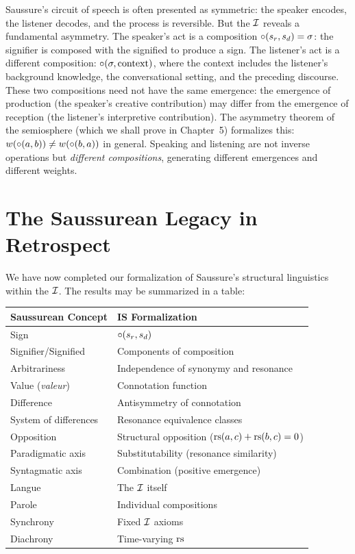 \begin{remark}
Saussure's circuit of speech is often presented as symmetric: the speaker encodes, the listener decodes, and the process is reversible. But the $\mathcal{I}$ reveals a fundamental asymmetry. The speaker's act is a composition $\circ(s_r, s_d) = \sigma$: the signifier is composed with the signified to produce a sign. The listener's act is a different composition: $\circ(\sigma, \text{context})$, where the context includes the listener's background knowledge, the conversational setting, and the preceding discourse. These two compositions need not have the same emergence: the emergence of production (the speaker's creative contribution) may differ from the emergence of reception (the listener's interpretive contribution). The asymmetry theorem of the semiosphere (which we shall prove in Chapter~5) formalizes this: $w(\circ(a, b)) \neq w(\circ(b, a))$ in general. Speaking and listening are not inverse operations but \emph{different compositions}, generating different emergences and different weights.
\end{remark}

\section{The Saussurean Legacy in Retrospect}

We have now completed our formalization of Saussure's structural
linguistics within the $\mathcal{I}$. The results may be summarized in a
table:

\begin{center}
\begin{tabular}{ll}
\textbf{Saussurean Concept} & \textbf{IS{} Formalization} \\
\hline
Sign & $\circ(s_r, s_d)$ \\
Signifier/Signified & Components of composition \\
Arbitrariness & Independence of synonymy and resonance \\
Value (\textit{valeur}) & Connotation function \\
Difference & Antisymmetry of connotation \\
System of differences & Resonance equivalence classes \\
Opposition & Structural opposition ($\mathrm{rs}(a,c) + \mathrm{rs}(b,c) = 0$) \\
Paradigmatic axis & Substitutability (resonance similarity) \\
Syntagmatic axis & Combination (positive emergence) \\
Langue & The $\mathcal{I}$ itself \\
Parole & Individual compositions \\
Synchrony & Fixed $\mathcal{I}$ axioms \\
Diachrony & Time-varying $\mathrm{rs}$ \\
\end{tabular}
\end{center}

